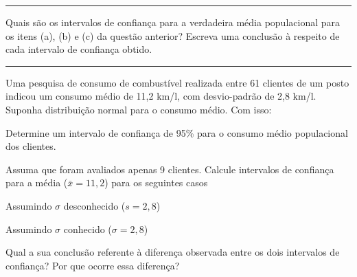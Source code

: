 \documentclass[a4paper,11pt,fleqn]{article}\usepackage[]{graphicx}\usepackage[]{color}
\theoremstyle{definition}
\begin{document}
\vspace{0.3cm}
\hrule
\vspace{0.3cm}

\begin{compactenum}[10.]
\item Quais são os intervalos de confiança para a verdadeira média
  populacional para os itens (a), (b) e (c) da questão anterior?
  Escreva uma conclusão à respeito de cada intervalo de confiança
  obtido.
\end{compactenum}

\vspace{0.3cm}
\hrule
\vspace{0.3cm}


\begin{compactenum}[11.] %
\item Uma pesquisa de consumo de combustível realizada entre 61
  clientes de um posto indicou um consumo médio de 11,2 km/l, com
  desvio-padrão de 2,8 km/l. Suponha distribuição normal para o
    consumo médio. Com isso:
  \begin{compactenum}
  \item Determine um intervalo de confiança de 95\% para o consumo médio
    populacional dos clientes.
  \item Assuma que foram avaliados apenas 9 clientes. Calcule intervalos
    de confiança para a média ($\bar{x} = 11,2$) para os seguintes casos
    \begin{compactenum}
    \item Assumindo $\sigma$ desconhecido ($s=2,8$)
    \item Assumindo $\sigma$ conhecido ($\sigma=2,8$)
    \end{compactenum}
    Qual a sua conclusão referente à diferença observada entre os dois
    intervalos de confiança? Por que ocorre essa diferença?
  \end{compactenum}
\end{compactenum}
\end{document}
